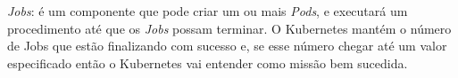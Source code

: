 


\textit{Jobs}: é um componente que pode criar um ou mais \textit{Pods}, e executará um procedimento até que os \textit{Jobs} possam terminar. O Kubernetes mantém o número de Jobs que estão finalizando com sucesso e, se esse número chegar até um valor especificado então o Kubernetes vai entender como missão bem sucedida.
